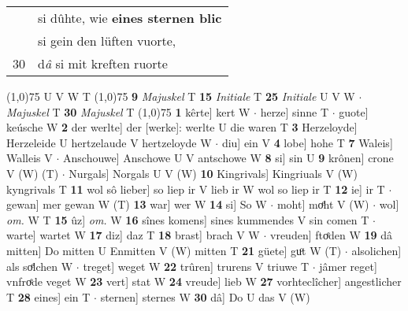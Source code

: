 \documentclass[8pt,a4paper,notitlepage]{article}
\begin{document}
\begin{table}[ht]
\begin{minipage}[t]{0.5\linewidth}
\begin{tabular}{rl}
 & si dûhte, wie \textbf{eines sternen blic}\\ 
 & si gein den lüften vuorte,\\ 
30 & d\textit{â} si mit kreften ruorte\\ 
\end{tabular}
\scriptsize
\line(1,0){75} \newline
U V W T \newline
\line(1,0){75} \newline
\textbf{9} \textit{Majuskel} T  \textbf{15} \textit{Initiale} T  \textbf{25} \textit{Initiale} U V W   $\cdot$ \textit{Majuskel} T  \textbf{30} \textit{Majuskel} T  \newline
\line(1,0){75} \newline
\textbf{1} kêrte] kert W  $\cdot$ herze] sinne T  $\cdot$ guote] keúsche W \textbf{2} der werlte] der [werke]: werlte U die waren T \textbf{3} Herzeloyde] Herzeleide U hertzelaude V hertzeloyde W  $\cdot$ diu] ein V \textbf{4} lobe] hohe T \textbf{7} Waleis] Walleis V  $\cdot$ Anschouwe] Anschowe U V antschowe W \textbf{8} si] sin U \textbf{9} krônen] crone V (W) (T)  $\cdot$ Nurgals] Norgals U V (W) \textbf{10} Kingrivals] Kingriuals V (W) kyngrivals T \textbf{11} wol sô lieber] so liep ir V lieb ir W wol so liep ir T \textbf{12} ie] ir T  $\cdot$ gewan] mer gewan W (T) \textbf{13} war] wer W \textbf{14} si] So W  $\cdot$ moht] moͤht V (W)  $\cdot$ wol] \textit{om.} W T \textbf{15} ûz] \textit{om.} W \textbf{16} sînes komens] sines kummendes V sin comen T  $\cdot$ warte] wartet W \textbf{17} diz] daz T \textbf{18} brast] brach V W  $\cdot$ vreuden] ftoͤden W \textbf{19} dâ mitten] Do mitten U Enmitten V (W) mitten T \textbf{21} güete] guͦt W (T)  $\cdot$ alsolichen] als soͤlchen W  $\cdot$ treget] weget W \textbf{22} trûren] trurens V triuwe T  $\cdot$ jâmer reget] vnfroͤde veget W \textbf{23} vert] stat W \textbf{24} vreude] lieb W \textbf{27} vorhteclîcher] angestlicher T \textbf{28} eines] ein T  $\cdot$ sternen] sternes W \textbf{30} dâ] Do U das V (W) \newline
\end{minipage}
\end{table}
\end{document}
